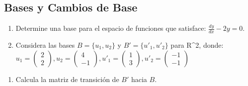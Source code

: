 \documentclass[
  11,
]{article}
\providecommand{\tightlist}{%
  \setlength{\itemsep}{0pt}\setlength{\parskip}{0pt}}
\begin{document}
\hypertarget{bases-y-cambios-de-base}{%
\subsection{Bases y Cambios de Base}\label{bases-y-cambios-de-base}}

\begin{enumerate}
\def\labelenumi{\arabic{enumi}.}
\item
  Determine una base para el espacio de funciones que satisface:
  \(\frac{dy}{dx}-2y=0\).
\item
  Considera las bases \(B = \{u_1,u_2\}\) y \(B' = \{u'_1,u'_2\}\) para
  R\^{}2, donde:
  \(u_1 = \begin{pmatrix}2\\2\end{pmatrix}, u_2 = \begin{pmatrix}4\\-1\end{pmatrix}, u'_1 = \begin{pmatrix}1\\3\end{pmatrix}, u'_2 = \begin{pmatrix}-1\\-1\end{pmatrix}\)
\end{enumerate}

\begin{enumerate}
\def\labelenumi{\alph{enumi})}
\tightlist
\item
  Calcula la matriz de transición de \(B'\) hacia \(B\).
\end{enumerate}
\end{document}
